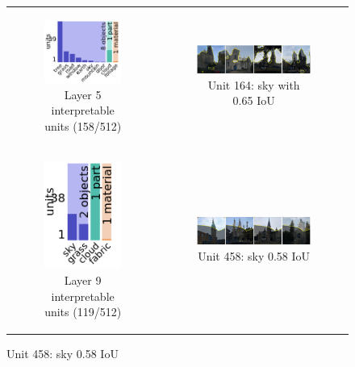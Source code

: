 \documentclass{article}
\begin{document}
\begin{figure}[h!]
\caption{Pix2Pix layers: Interpretable units distribution and highest IoU unit sample images}
\begin{tabular}{c c }
    \begin{subfigure}[h!]{0.3\textwidth}
        \caption{Layer 5 interpretable units (158/512)}
        \includegraphics[scale=0.5]{p2p_layer5.png}
    \end{subfigure} &
    \begin{subfigure}[h!]{0.5\textwidth}
        \caption{Unit 164: sky with 0.65 IoU}
        \includegraphics[scale=0.25]{images/p2p_layer5_unit164_0.65iou.png}
    \end{subfigure} \\
    \begin{subfigure}[h!]{0.3\textwidth}
        \caption{Layer 9 interpretable units (119/512)}
        \includegraphics[scale=0.5]{images/p2p_layer9.png}
    \end{subfigure} &
    \begin{subfigure}[h!]{0.5\textwidth}
        \caption{Unit 458: sky 0.58 IoU}
        \includegraphics[scale=0.25]{images/p2p_layer9_unit458_0.58iou.png}

\end{subfigure}
\end{tabular}
\end{figure}
\end{document}
